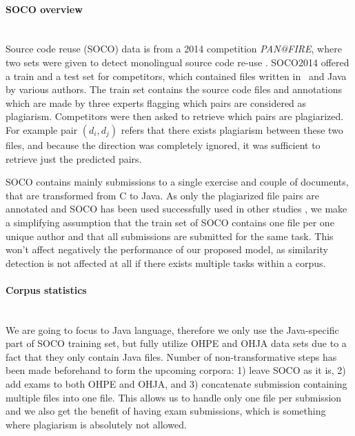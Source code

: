 \paragraph{SOCO overview}\mbox{}\\
Source code reuse (SOCO) data is from a 2014 competition \emph{PAN@FIRE}, where two sets were given to detect monolingual source code re-use \cite{saez2014pan}. SOCO2014 offered a train and a test set for competitors, which contained files written in \cpp\, and Java by various authors. The train set contains the source code files and annotations which are made by three experts flagging which pairs are considered as plagiarism. Competitors were then asked to retrieve which pairs are plagiarized. For example pair $(d_i, d_j)$ refers that there exists plagiarism between these two files, and because the direction was completely ignored, it was sufficient to retrieve just the predicted pairs.

SOCO contains mainly submissions to a single exercise and couple of documents, that are transformed from C to Java. As only the plagiarized file pairs are annotated and SOCO has been used successfully used in other studies \cite{AIR2015, RCISCP2017, OTIOLSS2015, USCR2014}, we make a simplifying assumption that the train set of SOCO contains one file per one unique author and that all submissions are submitted for the same task. This won't affect negatively the performance of our proposed model, as similarity detection is not affected at all if there exists multiple tasks within a corpus. 



\paragraph{Corpus statistics}\mbox{}\\
We are going to focus to Java language, therefore we only use the Java-specific part of SOCO training set, but fully utilize OHPE and OHJA data sets due to a fact that they only contain Java files. Number of non-transformative steps has been made beforehand to form the upcoming corpora: 1) leave SOCO as it is, 2) add exams to both OHPE and OHJA, and 3) concatenate submission containing multiple files into one file. This allows us to handle only one file per submission and we also get the benefit of having exam submissions, which is something where plagiarism is absolutely not allowed. 


